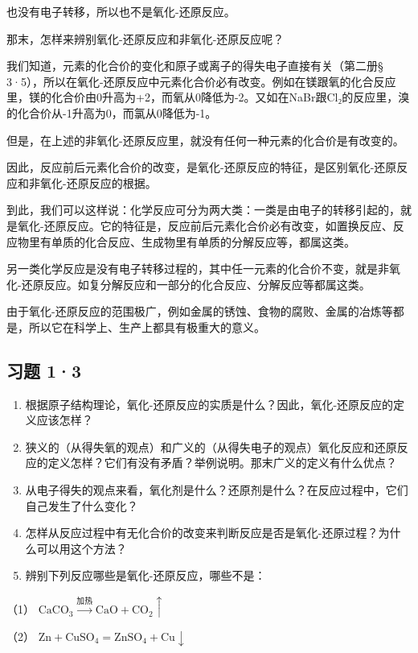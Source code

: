 也没有电子转移，所以也不是氧化-还原反应。

那末，怎样来辨别氧化-还原反应和非氧化-还原反应呢？

我们知道，元素的化合价的变化和原子或离子的得失电子直接有关（第二册§
3·5），所以在氧化-还原反应中元素化合价必有改变。例如在镁跟氧的化合反应里，镁的化合价由0升高为+2，而氧从0降低为-2。又如在NaBr跟Cl₂的反应里，溴的化合价从-1升高为0，而氯从0降低为-1。

但是，在上述的非氧化-还原反应里，就没有任何一种元素的化合价是有改变的。

因此，反应前后元素化合价的改变，是氧化-还原反应的特征，是区别氧化-还原反应和非氧化-还原反应的根据。

到此，我们可以这样说：化学反应可分为两大类：一类是由电子的转移引起的，就是氧化-还原反应。它的特征是，反应前后元素化合价必有改变，如置换反应、反应物里有单质的化合反应、生成物里有单质的分解反应等，都属这类。

另一类化学反应是没有电子转移过程的，其中任一元素的化合价不变，就是非氧化-还原反应。如复分解反应和一部分的化合反应、分解反应等都属这类。

由于氧化-还原反应的范围极广，例如金属的锈蚀、食物的腐败、金属的冶炼等都是，所以它在科学上、生产上都具有极重大的意义。

\subsection{习题 1·3}

\begin{enumerate}
\item
  根据原子结构理论，氧化-还原反应的实质是什么？因此，氧化-还原反应的定义应该怎样？
\item
  狭义的（从得失氧的观点）和广义的（从得失电子的观点）氧化反应和还原反应的定义怎样？它们有没有矛盾？举例说明。那末广义的定义有什么优点？
\item
  从电子得失的观点来看，氧化剂是什么？还原剂是什么？在反应过程中，它们自己发生了什么变化？
\item
  怎样从反应过程中有无化合价的改变来判断反应是否是氧化-还原过程？为什么可以用这个方法？
\item
  辨别下列反应哪些是氧化-还原反应，哪些不是：
\end{enumerate}

（1）
\(\mathrm{CaCO_3}\xrightarrow{\text{加热}}\mathrm{CaO} + \mathrm{CO}_2\uparrow\)

（2）
\(\mathrm{Zn} + \mathrm{CuSO}_4 = \mathrm{ZnSO}_4 + \mathrm{Cu}\downarrow\)

